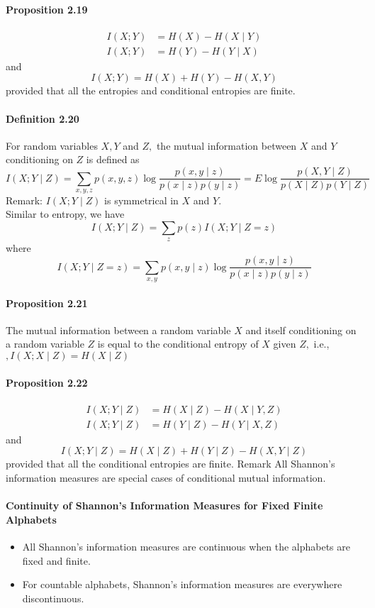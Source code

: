 \documentclass[8pt]{article}
\begin{document}
\paragraph{Proposition 2.19}
$$
\begin{aligned}
I(X ; Y) &=H(X)-H(X \mid Y) \\
I(X ; Y) &=H(Y)-H(Y \mid X)
\end{aligned}
$$
and
$$
I(X ; Y)=H(X)+H(Y)-H(X, Y)
$$
provided that all the entropies and conditional entropies are finite.

\paragraph{Definition 2.20} For random variables $X, Y$ and $Z,$ the mutual information between $X$ and $Y$ conditioning on $Z$ is defined as
$$
I(X ; Y \mid Z)=\sum_{x, y, z} p(x, y, z) \log \frac{p(x, y \mid z)}{p(x \mid z) p(y \mid z)}=E \log \frac{p(X, Y \mid Z)}{p(X \mid Z) p(Y \mid Z)}
$$
Remark: $I(X ; Y \mid Z)$ is symmetrical in $X$ and $Y$.\\
Similar to entropy, we have
$$
I(X ; Y \mid Z)=\sum_{z} p(z) I(X ; Y \mid Z=z)
$$
where
$$
I(X ; Y \mid Z=z)=\sum_{x, y} p(x, y \mid z) \log \frac{p(x, y \mid z)}{p(x \mid z) p(y \mid z)}
$$

\paragraph{Proposition 2.21} The mutual information between a random variable $X$ and itself conditioning on a random variable $Z$ is equal to the conditional entropy of $X$ given $Z,$ i.e., $, I(X ; X \mid Z)=H(X \mid Z)$
\paragraph{Proposition 2.22}
$$
\begin{aligned}
I(X ; Y \mid Z) &=H(X \mid Z)-H(X \mid Y, Z) \\
I(X ; Y \mid Z) &=H(Y \mid Z)-H(Y \mid X, Z)
\end{aligned}
$$
and
$$
I(X ; Y \mid Z)=H(X \mid Z)+H(Y \mid Z)-H(X, Y \mid Z)
$$
provided that all the conditional entropies are finite.
Remark All Shannon's information measures are special cases of conditional mutual information.

\paragraph{Continuity of Shannon’s Information Measures for Fixed Finite Alphabets}
\begin{itemize}
	\item All Shannon’s information measures are continuous when the alphabets are fixed and finite.
	\item For countable alphabets, Shannon’s information measures are everywhere discontinuous.
\end{itemize}
\end{document}
